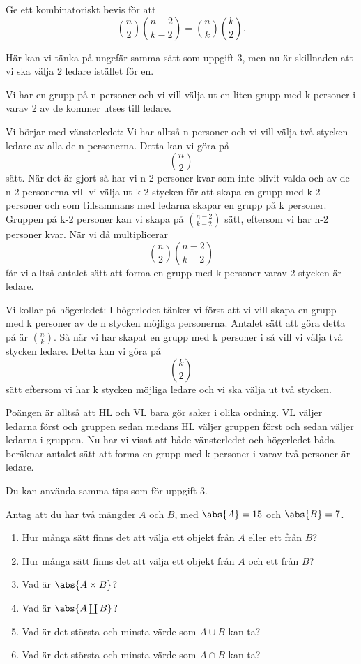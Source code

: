\documentclass{tufte-handout}
\begin{document}
\begin{xca}
	Ge ett kombinatoriskt bevis för att
	$$\binom{n}{2}\binom{n-2}{k-2} = \binom{n}{k}\binom{k}{2}.$$
\end{xca}

\begin{solution}
	Här kan vi tänka på ungefär samma sätt som uppgift 3, men nu är skillnaden att vi ska välja 2 ledare istället för en.

	Vi har en grupp på n personer och vi vill välja ut en liten grupp med k personer i varav 2 av de kommer utses till ledare.

	Vi börjar med vänsterledet: Vi har alltså n personer och vi vill välja två stycken ledare av alla de n personerna. Detta kan vi göra på
	$$\binom{n}{2}$$
	sätt. När det är gjort så har vi n-2 personer kvar som inte blivit valda och av de n-2 personerna vill vi välja ut k-2 stycken för att skapa en grupp med k-2 personer och som tillsammans med ledarna skapar en grupp på k personer. Gruppen på k-2 personer kan vi skapa på $\binom{n-2}{k-2}$ sätt, eftersom vi har n-2 personer kvar. När vi då multiplicerar
	$$\binom{n}{2}\binom{n-2}{k-2}$$
	får vi alltså antalet sätt att forma en grupp med k personer varav 2 stycken är ledare. 

	Vi kollar på högerledet: I högerledet tänker vi först att vi vill skapa en grupp med k personer av de n stycken möjliga personerna. Antalet sätt att göra detta på är $\binom{n}{k}$. Så när vi har skapat en grupp med k personer i så vill vi välja två stycken ledare. Detta kan vi göra på
	$$\binom{k}{2}$$
	sätt eftersom vi har k stycken möjliga ledare och vi ska välja ut två stycken.  

	Poängen är alltså att HL och VL bara gör saker i olika ordning. VL väljer ledarna först och gruppen sedan medans HL väljer gruppen först och sedan väljer ledarna i gruppen. Nu har vi visat att både vänsterledet och högerledet båda beräknar antalet sätt att forma en grupp med k personer i varav två personer är ledare. 

	\begin{tips}
		Du kan använda samma tips som för uppgift 3.
	\end{tips}
\end{solution}

\begin{xca}
	Antag att du har två mängder $A$ och $B$, med $\abs{A} = 15$ och $\abs{B} = 7$.
	\begin{enumerate}
		\item Hur många sätt finns det att välja ett objekt från $A$ eller ett från $B$?
		\item Hur många sätt finns det att välja ett objekt från $A$ och ett från $B$?
		\item Vad är $\abs{A\times B}$?
		\item Vad är $\abs{A \coprod B}$?
		\item Vad är det största och minsta värde som $A \cup B$ kan ta?
		\item Vad är det största och minsta värde som $A \cap B$ kan ta?
	\end{enumerate}
\end{xca}
\end{document}
